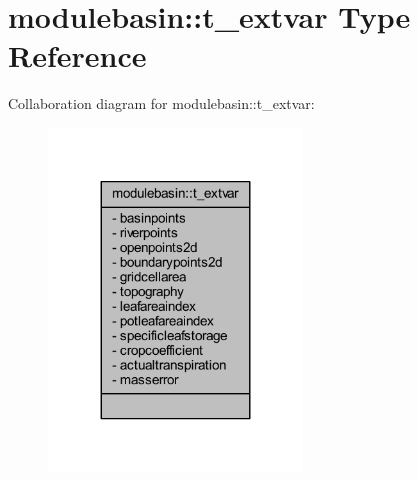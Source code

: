 \hypertarget{structmodulebasin_1_1t__extvar}{}\section{modulebasin\+:\+:t\+\_\+extvar Type Reference}
\label{structmodulebasin_1_1t__extvar}


Collaboration diagram for modulebasin\+:\+:t\+\_\+extvar\+:\nopagebreak
\begin{figure}[H]
\begin{center}
\leavevmode
\includegraphics[width=191pt]{structmodulebasin_1_1t__extvar__coll__graph}
\end{center}
\end{figure}
